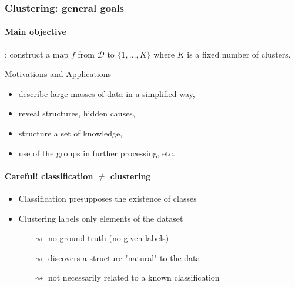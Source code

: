 \documentclass{beamer}\usepackage[]{graphicx}\usepackage[]{color}
\begin{document}
\begin{frame}[label=Clustering]
  \frametitle{Clustering: general goals}

  \paragraph{Main objective}: construct a map $f$ from $\mathcal{D}$ to $\{1,\ldots,K\}$ where $K$ is a fixed number of clusters.
    
  \vfill

  \begin{block}{Motivations and Applications}
    \begin{itemize}
    \item describe large masses of data in a simplified way,
    \item reveal structures, hidden causes,
    \item structure a set of knowledge,
    \item use of the groups in further processing, etc. 
  \end{itemize}
  \end{block}
  
  \vfill

  \paragraph{Careful! classification $\neq$ clustering}
      \begin{itemize}
      \item Classification presupposes the existence of classes
      \item Clustering labels only elements of the dataset
      \begin{itemize}
      \item[$\rightsquigarrow$] no ground truth (no given labels)
      \item[$\rightsquigarrow$] discovers a structure "natural" to the data
      \item[$\rightsquigarrow$] not necessarily related to a known classification
      \end{itemize}
      \end{itemize}
  
\end{frame}
\end{document}
